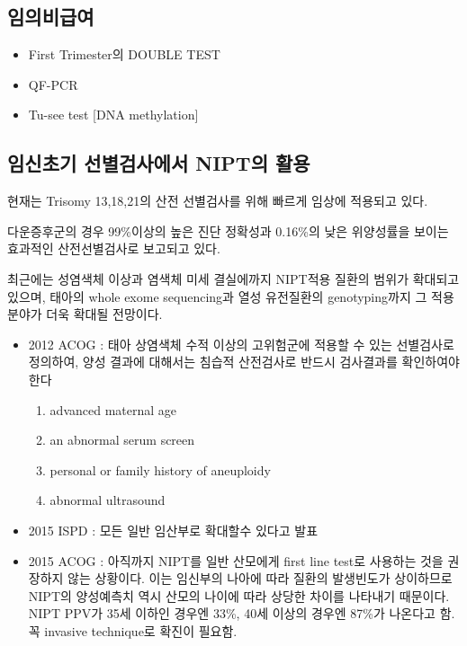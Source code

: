\subsection{임의비급여}
\begin{itemize}\tightlist
\item First Trimester의 DOUBLE TEST
\item QF-PCR
\item Tu-see test [DNA methylation]
\end{itemize}
\prezi{\clearpage}
\subsection{임신초기 선별검사에서 NIPT의 활용}
현재는 Trisomy 13,18,21의 산전 선별검사를 위해 빠르게 임상에 적용되고 있다. \par
다운증후군의 경우 99\%이상의 높은 진단 정확성과 0.16\%의 낮은 위양성률을 보이는 효과적인 산전선별검사로 보고되고 있다.\par
최근에는 성염색체 이상과 염색체 미세 결실에까지 NIPT적용 질환의 범위가 확대되고 있으며, 태아의 whole exome sequencing과 열성 유전질환의 genotyping까지 그 적용 분야가 더욱 확대될 전망이다.
\begin{itemize}\tightlist
\item 2012 ACOG : 태아 상염색체 수적 이상의 고위험군에 적용할 수 있는 선별검사로 정의하여, 양성 결과에 대해서는 침습적 산전검사로 반드시 검사결과를 확인하여야 한다
	\begin{enumerate}\tightlist
	\item advanced maternal age
	\item an abnormal serum screen
	\item personal or family history of aneuploidy
	\item abnormal ultrasound
	\end{enumerate}
\item 2015 ISPD : 모든 일반 임산부로 확대할수 있다고 발표
\item 2015 ACOG : 아직까지 NIPT를 일반 산모에게 first line test로 사용하는 것을 권장하지 않는 상황이다. 이는 임신부의 나아에 따라 질환의 발생빈도가 상이하므로 NIPT의 양성예측치 역시 산모의 나이에 따라 상당한 차이를 나타내기 때문이다. 
 NIPT PPV가 35세 이하인 경우엔 33\%, 40세 이상의 경우엔 87\%가 나온다고 함. 꼭 invasive technique로 확진이 필요함.
\end{itemize}
\prezi{\clearpage}
\par
\medskip
{}



